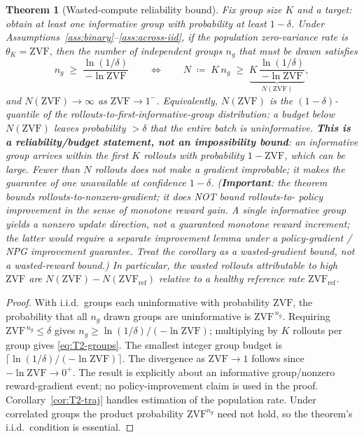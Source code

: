 \documentclass[11pt]{article}
\theoremstyle{plain}
\newtheorem{theorem}{Theorem}
\theoremstyle{definition}
\theoremstyle{remark}
\newcommand{\ZVF}{\ensuremath{\mathrm{ZVF}}}
\newcommand{\1}{\mathbb{1}}
\begin{document}
\begin{theorem}[Wasted-compute reliability bound]\label{thm:T2}
Fix group size $K$ and a target: obtain at least one informative group with
probability at least $1-\delta$. Under
Assumptions~\ref{ass:binary}--\ref{ass:across-iid}, if the population
zero-variance rate is $\theta_K=\ZVF$, then the number of \emph{independent
groups} $n_g$ that must be drawn satisfies
\begin{equation}\label{eq:T2-groups}
n_g \;\ge\; \frac{\ln(1/\delta)}{-\ln \ZVF}
\qquad\Longleftrightarrow\qquad
N \;\coloneqq\; K\,n_g \;\ge\;
\underbrace{K\,\frac{\ln(1/\delta)}{-\ln \ZVF}}_{\displaystyle N(\ZVF)}\!,
\end{equation}
and $N(\ZVF)\to\infty$ as $\ZVF\to1^-$. Equivalently, $N(\ZVF)$ is the
$(1-\delta)$-quantile of the rollouts-to-first-informative-group
distribution: a budget below $N(\ZVF)$ leaves probability $>\delta$
that the \emph{entire batch} is uninformative. \textbf{This is a
reliability/budget statement, not an impossibility bound}: an
informative group arrives within the first $K$ rollouts with
probability $1-\ZVF$, which can be large. Fewer than $N$ rollouts does
not make a gradient improbable; it makes the \emph{guarantee} of one
unavailable at confidence $1-\delta$. (\textbf{Important}: the theorem bounds
rollouts-to-nonzero-\emph{gradient}; it does NOT bound rollouts-to-
\emph{policy improvement} in the sense of monotone reward gain. A
single informative group yields a nonzero update direction, not a
guaranteed monotone reward increment; the latter would require a
separate improvement lemma under a policy-gradient / NPG
improvement guarantee. Treat the corollary as a wasted-\emph{gradient}
bound, not a wasted-\emph{reward} bound.) In particular, the
\emph{wasted} rollouts attributable to high $\ZVF{}$ are
$N(\ZVF)-N(\ZVF_{\text{ref}})$ relative to a healthy reference rate
$\ZVF_{\text{ref}}$.
\end{theorem}
\begin{proof}
With i.i.d.\ groups each uninformative with probability $\ZVF$, the probability
that all $n_g$ drawn groups are uninformative is $\ZVF^{\,n_g}$. Requiring
$\ZVF^{\,n_g}\le\delta$ gives $n_g\ge \ln(1/\delta)/(-\ln \ZVF)$; multiplying by
$K$ rollouts per group gives \eqref{eq:T2-groups}. The smallest integer group
budget is $\lceil\ln(1/\delta)/(-\ln\ZVF)\rceil$. The divergence as
$\ZVF\to1$ follows since $-\ln \ZVF\to0^+$. The result is explicitly about an
informative group/nonzero reward-gradient event; no policy-improvement claim is
used in the proof. Corollary~\ref{cor:T2-traj} handles estimation of the
population rate. Under correlated groups the product probability
$\ZVF^{n_g}$ need not hold, so the theorem's i.i.d.\ condition is essential.
\end{proof}
\end{document}
